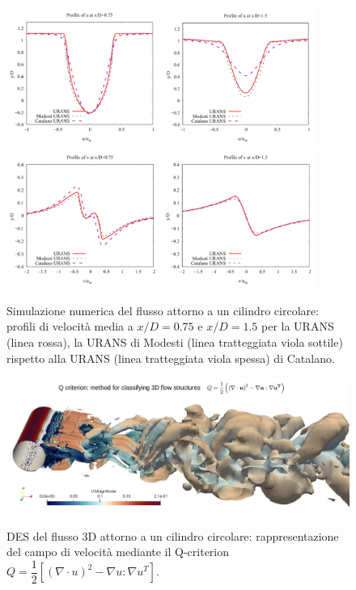 \documentclass[a5paper]{sapthesis}
\begin{document}
	\begin{figure}[htp]
		\centering
		\subfloat
		{\includegraphics[width=0.9\textwidth, height=0.27\textheight]{Figures/Cylinder_u.pdf}} \quad 
		\subfloat
		\centering
		{\includegraphics[width=0.9\textwidth, height=0.27\textheight]{Figures/Cylinder_v}}
		\caption{Simulazione numerica del flusso attorno a un cilindro circolare: proﬁli di velocità media a $x/D = 0.75$ e $x/D = 1.5$ per la URANS (linea rossa), la URANS di Modesti (linea tratteggiata viola sottile) rispetto alla URANS (linea tratteggiata viola spessa) di Catalano.}
		\label{Cylinder}
	\end{figure}
	
	\begin{figure}[htp]
		\begin{center}
			{\includegraphics[width=0.98\linewidth]{Figures/Des_cylinder}}  
			\caption{DES del flusso 3D attorno a un cilindro circolare: rappresentazione del campo di velocità mediante il Q-criterion $Q = \dfrac{1}{2} [(\nabla \cdot u)^2 - \nabla u : \nabla u^T]$.}
			\label{Des_Cylinder}
		\end{center}
	\end{figure}
	
\end{document}
